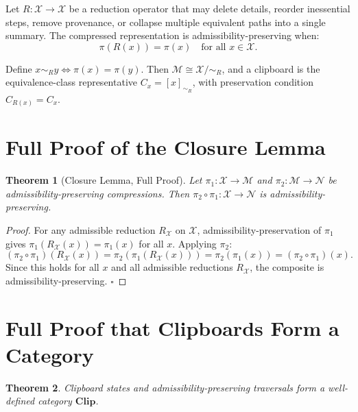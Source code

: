 \documentclass[12pt,oneside]{book}
\theoremstyle{plain}
\newtheorem{theorem}{Theorem}[chapter]
\theoremstyle{definition}
\theoremstyle{plain}
\newcommand{\Clip}{\mathbf{Clip}}
\newcommand{\cM}{\mathcal{M}}
\newcommand{\cX}{\mathcal{X}}
\begin{document}
Let $R : \cX \to \cX$ be a reduction operator that may delete details, reorder inessential steps, remove provenance, or collapse multiple equivalent paths into a single summary. The compressed representation is admissibility-preserving when:
\[
\pi(R(x)) = \pi(x) \quad \text{for all } x \in \cX.
\]

Define $x \sim_R y \Longleftrightarrow \pi(x) = \pi(y)$. Then $\cM \cong \cX/{\sim_R}$, and a clipboard is the equivalence-class representative $C_x = [x]_{\sim_R}$, with preservation condition $C_{R(x)} = C_x$.

\section{Full Proof of the Closure Lemma}

\begin{theorem}[Closure Lemma, Full Proof]
Let $\pi_1 : \cX \to \cM$ and $\pi_2 : \cM \to \mathcal{N}$ be admissibility-preserving compressions. Then $\pi_2 \circ \pi_1 : \cX \to \mathcal{N}$ is admissibility-preserving.
\end{theorem}

\begin{proof}
For any admissible reduction $R_\cX$ on $\cX$, admissibility-preservation of $\pi_1$ gives $\pi_1(R_\cX(x)) = \pi_1(x)$ for all $x$. Applying $\pi_2$:
\[
(\pi_2 \circ \pi_1)(R_\cX(x)) = \pi_2(\pi_1(R_\cX(x))) = \pi_2(\pi_1(x)) = (\pi_2 \circ \pi_1)(x).
\]
Since this holds for all $x$ and all admissible reductions $R_\cX$, the composite is admissibility-preserving. $\square$
\end{proof}

\section{Full Proof that Clipboards Form a Category}

\begin{theorem}
Clipboard states and admissibility-preserving traversals form a well-defined category $\Clip$.
\end{theorem}
\end{document}
